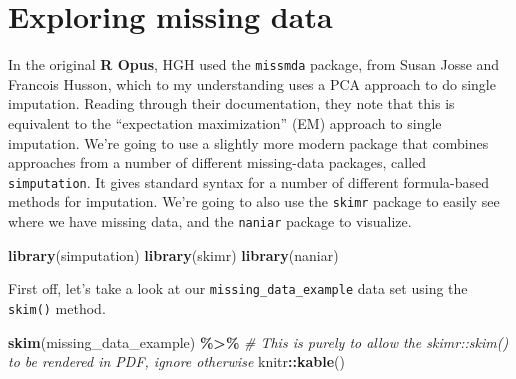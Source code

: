 \documentclass[
]{book}
\newenvironment{Shaded}{\begin{snugshade}}{\end{snugshade}}
\newcommand{\CommentTok}[1]{\textcolor[rgb]{0.56,0.35,0.01}{\textit{#1}}}
\newcommand{\FunctionTok}[1]{\textcolor[rgb]{0.13,0.29,0.53}{\textbf{#1}}}
\newcommand{\NormalTok}[1]{#1}
\newcommand{\SpecialCharTok}[1]{\textcolor[rgb]{0.81,0.36,0.00}{\textbf{#1}}}
\begin{document}
\section{Exploring missing data}\label{exploring-missing-data}

In the original \textbf{R Opus}, HGH used the \texttt{missmda} package, from Susan Josse and Francois Husson, which to my understanding uses a PCA approach to do single imputation. Reading through their documentation, they note that this is equivalent to the ``expectation maximization'' (EM) approach to single imputation. We're going to use a slightly more modern package that combines approaches from a number of different missing-data packages, called \texttt{simputation}. It gives standard syntax for a number of different formula-based methods for imputation. We're going to also use the \texttt{skimr} package to easily see where we have missing data, and the \texttt{naniar} package to visualize.

\begin{Shaded}
\begin{Highlighting}[]
\FunctionTok{library}\NormalTok{(simputation)}
\FunctionTok{library}\NormalTok{(skimr)}
\FunctionTok{library}\NormalTok{(naniar)}
\end{Highlighting}
\end{Shaded}

First off, let's take a look at our \texttt{missing\_data\_example} data set using the \texttt{skim()} method.

\begin{Shaded}
\begin{Highlighting}[]
\FunctionTok{skim}\NormalTok{(missing\_data\_example) }\SpecialCharTok{\%\textgreater{}\%} 
  \CommentTok{\# This is purely to allow the skimr::skim() to be rendered in PDF, ignore otherwise}
\NormalTok{  knitr}\SpecialCharTok{::}\FunctionTok{kable}\NormalTok{()}
\end{Highlighting}
\end{Shaded}
\end{document}
